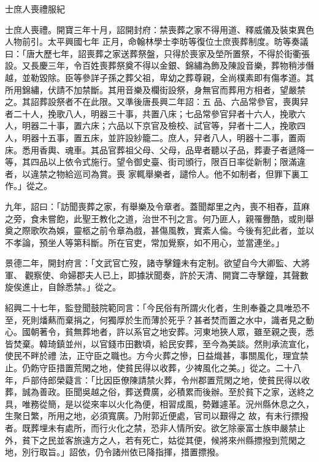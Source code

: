 
\begin{pinyinscope}

 士庶人喪禮服紀



 士庶人喪禮。開寶三年十月，詔開封府：禁喪葬之家不得用道、釋威儀及裝束異色人物前引。太平興國七年
 正月，命翰林學士李昉等復位士庶喪葬制度。昉等奏議曰：「唐大歷七年，詔喪葬之家送葬祭盤，只得於喪家及塋所置祭，不得於街衢張設。又長慶三年，令百姓喪葬祭奠不得以金銀、錦繡為飾及陳設音樂，葬物稍涉僭越，並勒毀除。臣等參詳子孫之葬父祖，卑幼之葬尊親，全尚樸素即有傷孝道。其所用錦繡，伏請不加禁斷。其用音樂及欄街設祭，身無官而葬用方相者，望嚴禁之。其詔葬設祭者不在此限。又準後唐長興二年詔：五
 品、六品常參官，喪輿舁者二十人，挽歌八人，明器三十事，共置八床；七品常參官舁者十六人，挽歌六人，明器二十事，置六床；六品以下京官及檢校、試官等，舁者十二人，挽歌四人，明器十五事，置五床，並許設紗籠二。庶人，舁者八人，明器十二事，置兩床。悉用香輿、魂車。其品官葬祖父母、父母，品卑者聽以子品，葬妻子者遞降一等，其四品以上依令式施行。望令御史臺、街司頒行，限百日率從新制；限滿違者，以違禁之物給巡司為賞。喪
 家輒舉樂者，譴伶人。他不如制者，但罪下裏工作。」從之。



 九年，詔曰：「訪聞喪葬之家，有舉樂及令章者。蓋聞鄰里之內，喪不相舂，苴麻之旁，食未嘗飽，此聖王教化之道，治世不刊之言。何乃匪人，親罹釁酷，或則舉奠之際歌吹為娛，靈柩之前令章為戲，甚傷風教，實紊人倫。今後有犯此者，並以不孝論，預坐人等第科斷。所在官吏，常加覺察，如不用心，並當連坐。」



 景德二年，開封府言：「文武官亡歿，諸寺擊鐘未有定制。欲望自今大卿監、大將軍、
 觀察使、命婦郡夫人已上，即據狀聞奏，許於天清、開寶二寺擊鐘，其聲數旋俟進止，自餘悉禁。」從之。



 紹興二十七年，監登聞鼓院範同言：「今民俗有所謂火化者，生則奉養之具唯恐不至，死則燔爇而棄捐之，何獨厚於生而薄於死乎？甚者焚而置之水中，識者見之動心。國朝著令，貧無葬地者，許以系官之地安葬。河東地狹人眾，雖至親之喪，悉皆焚棄。韓琦鎮並州，以官錢市田數頃，給民安葬，至今為美談。然則承流宣化，使民不畔於禮
 法，正守臣之職也。方今火葬之慘，日益熾甚，事關風化，理宜禁止。仍飭守臣措置荒閑之地，使貧民得以收葬，少裨風化之美。」從之。二十八年，戶部侍郎榮薿言：「比因臣僚陳請禁火葬，令州郡置荒閑之地，使貧民得以收葬，誠為善政。臣聞吳越之俗，葬送費廣，必積累而後辦。至於貧下之家，送終之具，唯務從簡，是以從來率以火化為便，相習成風，勢難遽革。況州縣休息之久，生聚日繁，所用之地，必須寬廣。乃附郭近便處，官司以艱得之
 故，有未行摽撥者。既葬埋未有處所，而行火化之禁，恐非人情所安。欲乞除豪富士族申嚴禁止外，貧下之民並客旅遠方之人，若有死亡，姑從其便，候將來州縣摽撥到荒閑之地，別行取旨。」詔依，仍令諸州依已降指揮，措置摽撥。




\end{pinyinscope}
